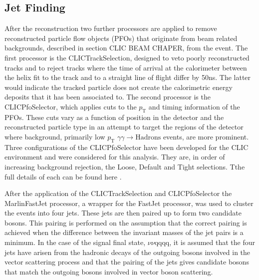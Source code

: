 \subsection{Jet Finding} 
\label{sec:jetpairing}
After the reconstruction two further processors are applied to remove reconstructed particle flow objects (PFOs) that originate from beam related backgrounds, described in section CLIC BEAM CHAPER, from the event.  The first processor is the CLICTrackSelection, designed to veto poorly reconstructed tracks and to reject tracks where the time of arrival at the calorimeter between the helix fit to the track and to a straight line of flight differ by 50ns.  The latter would indicate the tracked particle does not create the calorimetric energy deposits that it has been associated to.  The second processor is the CLICPfoSelector, which applies cuts to the $p_{\text{T}}$ and timing information of the PFOs.  These cuts vary as a function of position in the detector and the reconstructed particle type in an attempt to target the regions of the detector where background, primarily low $p_{\text{T}}$ $\gamma\gamma \rightarrow \text{Hadrons}$ events, are more prominent.  Three configurations of the CLICPfoSelector have been developed for the CLIC environment and were considered for this analysis.  They are, in order of increasing background rejection, the Loose, Default and Tight selections. Tthe full details of each can be found here \cite{arXiv:1209.4039}.

After the application of the CLICTrackSelection and CLICPfoSelector the MarlinFastJet processor, a wrapper for the FastJet \cite{Cacciari:2011ma} processor, was used to cluster the events into four jets.  These jets are then paired up to form two candidate bosons.  This pairing is performed on the assumption that the correct pairing is achieved when the difference between the invariant masses of the jet pairs is a minimum.  In the case of the signal final state, $\nu\nu$qqqq, it is assumed that the four jets have arisen from the hadronic decays of the outgoing bosons involved in the vector scattering process and that the pairing of the jets gives candidate bosons that match the outgoing bosons involved in vector boson scattering. 

